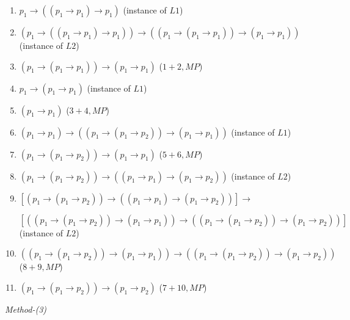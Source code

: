 \documentclass[UTF8,12pt,a4paper]{ctexart}
\begin{document}
\begin{enumerate}
	\item $p_1 \to ((p_1 \to p_1) \to p_1)$  
	\hfill (instance of $L1$)
	
	\item $(p_1 \to ((p_1 \to p_1) \to p_1))   \to   (  (p_1 \to (p_1 \to p_1)) \to (p_1 \to p_1) )$ 
	\hfill (instance of $L2$)
	
	\item $(p_1 \to (p_1 \to p_1)) \to (p_1 \to p_1)$ 
	\hfill ($1+2, MP$)
	
	\item $p_1 \to (p_1 \to p_1)$ 
	\hfill (instance of $L1$)
	
	\item $(p_1 \to p_1)$
	\hfill ($3+4, MP$)
	
	\item $(p_1 \to p_1) \to ( (p_1 \to (p_1 \to p_2)) \to (p_1 \to p_1) )$  
	\hfill (instance of $L1$)
	
	\item $(p_1 \to (p_1 \to p_2)) \to (p_1 \to p_1)$ 
	\hfill ($5+6, MP$)
	
	\item $( p_1 \to (p_1 \to p_2))  \to  ( (p_1 \to p_1)  \to (p_1 \to p_2) )$  
	\hfill (instance of $L2$)
	
	\item $ [(p_1 \to (p_1 \to p_2)) \to ((p_1 \to p_1) \to (p_1 \to p_2))] \to  $
	
	$
	[( (p_1 \to (p_1 \to p_2)) \to (p_1 \to p_1))  \to
	( (p_1 \to (p_1 \to p_2)) \to (p_1 \to p_2)) ]
	$
	\hfill (instance of $L2$)
	
	\item $( (p_1 \to (p_1 \to p_2)) \to (p_1 \to p_1))  \to
	( (p_1 \to (p_1 \to p_2)) \to (p_1 \to p_2)) $  
	\hfill ($8+9,MP$)
	
	\item $(p_1 \to (p_1 \to p_2)) \to (p_1 \to p_2)$ 
	\hfill ($7+10, MP$)
\end{enumerate}


\vspace{1em}

\noindent\textit{Method-(3)}
\end{document}
